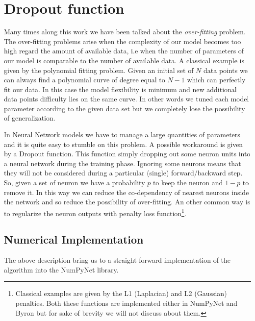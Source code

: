 \documentclass{standalone}
\begin{document}
\section[Dropout function]{Dropout function}\label{NN:dropout}

Many times along this work we have been talked about the \emph{over-fitting} problem.
The over-fitting problems arise when the complexity of our model becomes too high regard the amount of available data, i.e when the number of parameters of our model is comparable to the number of available data.
A classical example is given by the polynomial fitting problem.
Given an initial set of $N$ data points we can always find a polynomial curve of degree equal to $N-1$ which can perfectly fit our data.
In this case the model flexibility is minimum and new additional data points difficulty lies on the same curve.
In other words we tuned each model parameter according to the given data set but we completely lose the possibility of generalization.

In Neural Network models we have to manage a large quantities of parameters and it is quite easy to stumble on this problem.
A possible workaround is given by a Dropout function.
This function simply dropping out some neuron units into a neural network during the training phase.
Ignoring some neurons means that they will not be considered during a particular (single) forward/backward step.
So, given a set of neuron we have a probability $p$ to keep the neuron and $1-p$ to remove it.
In this way we can reduce the co-dependency of nearest neurons inside the network and so reduce the possibility of over-fitting.
An other common way is to regularize the neuron outputs with penalty loss function\footnote{
  Classical examples are given by the L1 (Laplacian) and L2 (Gaussian) penalties.
  Both these functions are implemented either in NumPyNet and Byron but for sake of brevity we will not discuss about them.
}.



\subsection[Numerical Implementation]{Numerical Implementation}\label{NN:drop_num}

The above description bring us to a straight forward implementation of the algorithm into the NumPyNet library.
\end{document}
